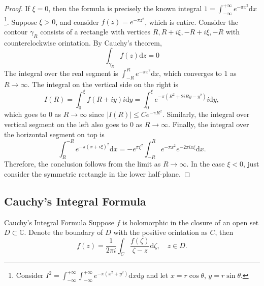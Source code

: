 \begin{proof}
  If $\xi = 0$, then the formula is precisely the known integral $1 = \int_{-\infty}^{+\infty} e^{-\pi x^2}\mathrm{d} x$
  \footnote{Consider $I^2 = \int_{-\infty}^{+\infty}\int_{-\infty}^{+\infty} e^{-\pi (x^2 + y^2)}\mathrm{d} x \mathrm{d}y$
    and let $x = r \cos \theta$, $y = r\sin \theta$.}.
  Suppose $\xi > 0$, and consider $f(z) = e^{-\pi z^2}$, which is entire.
  Consider the contour $\gamma_R$ consists of a rectangle with vertices
  $R, R+i\xi, -R+i\xi, -R$ with counterclockwise orintation.
  By Cauchy's theorem, 
  \begin{equation}
    \int_{\gamma_R} f(z)\mathrm{d} z = 0
  \end{equation}
  The integral over the real segment is $\int_{-R}^R e^{-\pi x^2} \mathrm{d} x$,
  which converges to $1$ as $R \rightarrow \infty$.
  The integral on the vertical side on the right is
  \begin{equation}
    I(R) = \int^{\xi}_0 f(R + iy)i \mathrm{d} y = \int_0^{\xi} e^{-\pi (R^2 + 2i Ry - y^2)}i \mathrm{d} y,
  \end{equation}
  which goes to $0$ as $R \rightarrow \infty$ since $|I(R)| \leq C e^{-\pi R^2}$.
  Similarly, the integral over vertical segment on the left also goes to $0$ as $R \rightarrow \infty$.
  Finally, the integral over the horizontal segment on top is
  \begin{equation}
    \int_R^{-R} e^{-\pi (x+i\xi)^2}\mathrm{d} x = - e^{\pi \xi^2} \int_{-R}^R e^{-\pi x^2}e^{-2\pi i x \xi}\mathrm{d} x.
  \end{equation}
  Therefore, the conclusion follows from the limit as $R \rightarrow \infty$.
  In the case $\xi < 0$, just consider the symmetric rectangle in the lower half-plane.
\end{proof}

\subsection{Cauchy's Integral Formula}

\begin{theorem}{Cauchy's Integral Formula}{}
  Suppose $f$ is holomorphic in the closure of an open set $D \subset \mathbb{C}$.
  Denote the boundary of $D$ with the positive orintation as $C$, then
  \begin{equation}
    f(z) = \frac{1}{2 \pi i} \int_C \frac{f(\zeta)}{\zeta - z}\mathrm{d} \zeta, \quad
    z \in D.
  \end{equation}
\end{theorem}

